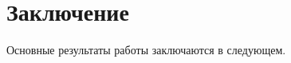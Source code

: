 \chapter*{Заключение}                       %


Основные результаты работы заключаются в следующем.






